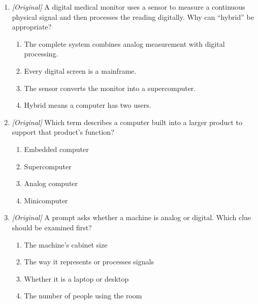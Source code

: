 \documentclass[11pt]{article}
\begin{document}
\begin{enumerate}[label=\textbf{Q\arabic*.}, leftmargin=*]
  computation rather than transaction volume. Which class is the best fit?
  \begin{enumerate}[label=\Alph*.]
    \item Mainframe
    \item Supercomputer
    \item Minicomputer
    \item Embedded computer
  \end{enumerate}
\item \textit{[Original]} A digital medical monitor uses a sensor to
  measure a continuous physical signal and then processes the reading
  digitally. Why can ``hybrid'' be appropriate?
  \begin{enumerate}[label=\Alph*.]
    \item The complete system combines analog measurement with digital
      processing.
    \item Every digital screen is a mainframe.
    \item The sensor converts the monitor into a supercomputer.
    \item Hybrid means a computer has two users.
  \end{enumerate}
\item \textit{[Original]} Which term describes a computer built into a larger
  product to support that product's function?
  \begin{enumerate}[label=\Alph*.]
    \item Embedded computer
    \item Supercomputer
    \item Analog computer
    \item Minicomputer
  \end{enumerate}
\item \textit{[Original]} A prompt asks whether a machine is analog or
  digital. Which clue should be examined first?
  \begin{enumerate}[label=\Alph*.]
    \item The machine's cabinet size
    \item The way it represents or processes signals
    \item Whether it is a laptop or desktop
    \item The number of people using the room
  \end{enumerate}


\end{enumerate}
\end{document}
